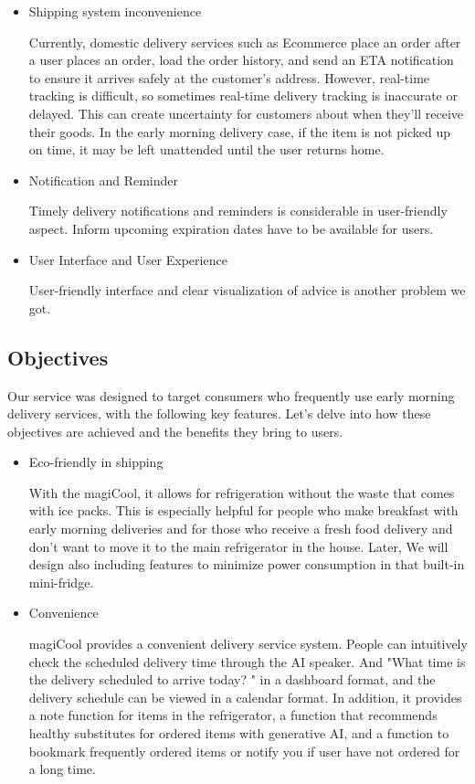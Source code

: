 \documentclass[conference]{IEEEtran}
\begin{document}
\begin{itemize}
    \item Shipping system inconvenience \par
    Currently, domestic delivery services such as Ecommerce place an order after a user places an order, load the order history, and send an ETA notification to ensure it arrives safely at the customer's address. However, real-time tracking is difficult, so sometimes real-time delivery tracking is inaccurate or delayed. This can create uncertainty for customers about when they'll receive their goods. In the early morning delivery case, if the item is not picked up on time, it may be left unattended until the user returns home.
    
    \item Notification and Reminder\par
    Timely delivery notifications and reminders is considerable in user-friendly aspect. Inform upcoming expiration dates have to be available for users.
   
    \item User Interface and User Experience\par
    User-friendly interface and clear visualization of advice is another problem we got.
\end{itemize}


\subsection{Objectives}
Our service was designed to target consumers who frequently use early morning delivery services, with the following key features. Let's delve into how these objectives are achieved and the benefits they bring to users.

\begin{itemize}
    \item Eco-friendly in shipping \par
    With the magiCool, it allows for refrigeration without the waste that comes with ice packs.  This is especially helpful for people who make breakfast with early morning deliveries and for those who receive a fresh food delivery and don't want to move it to the main refrigerator in the house. Later, We will design also including features to minimize power consumption in that built-in mini-fridge. 
    \item Convenience\par
    magiCool provides a convenient delivery service system. People can intuitively check the scheduled delivery time through the AI speaker. And "What time is the delivery scheduled to arrive today? " in a dashboard format, and the delivery schedule can be viewed in a calendar format. 
    In addition, it provides a note function for items in the refrigerator, a function that recommends healthy substitutes for ordered items with generative AI, and a function to bookmark frequently ordered items or notify you if user have not ordered for a long time. 


\end{itemize}
\end{document}
